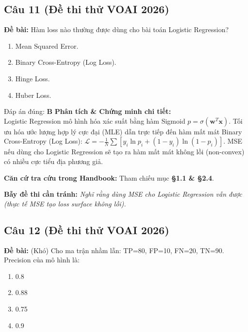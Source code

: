 \documentclass[10pt,a4paper]{article}
\begin{document}
\subsection*{Câu 11 (Đề thi thử VOAI 2026)}
\textbf{Đề bài:} Hàm loss nào thường được dùng cho bài toán Logistic Regression?

\begin{enumerate}[label=\textbf{\Alph*.}]
    \item Mean Squared Error.
    \item Binary Cross-Entropy (Log Loss).
    \item Hinge Loss.
    \item Huber Loss.
\end{enumerate}

\begin{solbox}{Đáp án đúng: \textbf{B}}
\textbf{Phân tích \& Chứng minh chi tiết:} \\
Logistic Regression mô hình hóa xác suất bằng hàm Sigmoid $p = \sigma(\mathbf{w}^T \mathbf{x})$. Tối ưu hóa ước lượng hợp lý cực đại (MLE) dẫn trực tiếp đến hàm mất mát Binary Cross-Entropy (Log Loss): $\mathcal{L} = -\frac{1}{N} \sum [y_i \ln p_i + (1 - y_i) \ln(1 - p_i)]$. MSE nếu dùng cho Logistic Regression sẽ tạo ra hàm mất mát không lồi (non-convex) có nhiều cực tiểu địa phương giả.

\vspace{0.4em}
\textbf{Căn cứ tra cứu trong Handbook:} Tham chiếu mục \textbf{§1.1 \& §2.4}.

\vspace{0.4em}
\textbf{Bẫy đề thi cần tránh:} \textit{Nghĩ rằng dùng MSE cho Logistic Regression vẫn được (thực tế MSE tạo loss surface không lồi).}
\end{solbox}
\vspace{0.5em}


\subsection*{Câu 12 (Đề thi thử VOAI 2026)}
\textbf{Đề bài:} (Khó) Cho ma trận nhầm lẫn: TP=80, FP=10, FN=20, TN=90. Precision của mô hình là:

\begin{enumerate}[label=\textbf{\Alph*.}]
    \item 0.8
    \item 0.88
    \item 0.75
    \item 0.9
\end{enumerate}
\end{document}
